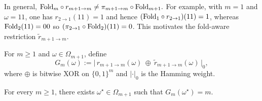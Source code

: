 \begin{remark}\label{rem:noncommute-truncation}
In general,
\(
\mathrm{Fold}_m\circ r_{m+1\to m}\neq \pi_{m+1\to m}\circ \mathrm{Fold}_{m+1}.
\)
For example, with $m=1$ and $\omega=11$, one has $r_{2\to 1}(11)=1$ and hence $(\mathrm{Fold}_1\circ r_{2\to 1})(11)=1$, whereas $\mathrm{Fold}_2(11)=00$ so $(\pi_{2\to 1}\circ\mathrm{Fold}_2)(11)=0$.
This motivates the fold-aware restriction $\widetilde r_{m+1\to m}$.
\end{remark}

\begin{definition}\label{def:gauge-anomaly}
For $m\ge 1$ and $\omega\in\Omega_{m+1}$, define
\[
G_m(\omega):=\bigl|\,r_{m+1\to m}(\omega)\ \oplus\ \widetilde r_{m+1\to m}(\omega)\,\bigr|_0,
\]
where $\oplus$ is bitwise XOR on $\{0,1\}^m$ and $|\cdot|_0$ is the Hamming weight.
\end{definition}

\begin{proposition}\label{prop:gauge-anomaly-max}
For every $m\ge 1$, there exists $\omega^\star\in\Omega_{m+1}$ such that $G_m(\omega^\star)=m$.
\end{proposition}

